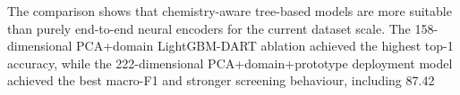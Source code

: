 The comparison shows that chemistry-aware tree-based models are more suitable than purely end-to-end neural encoders for the current dataset scale. The 158-dimensional PCA+domain LightGBM-DART ablation achieved the highest top-1 accuracy, while the 222-dimensional PCA+domain+prototype deployment model achieved the best macro-F1 and stronger screening behaviour, including 87.42%
